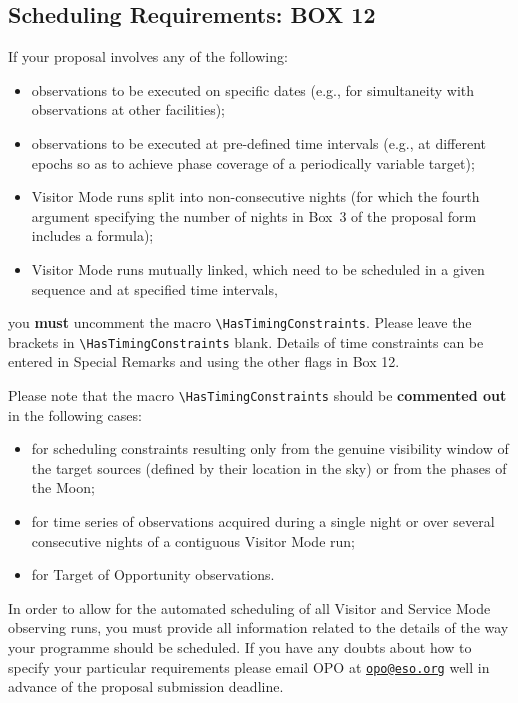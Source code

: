 \documentclass{article}
\begin{document}
\subsection{Scheduling Requirements: {\bf BOX 12}}
\label{sec:schedreq}
If your proposal involves any of the following:
\begin{itemize}
\item observations to be executed on specific dates (e.g., for
  simultaneity with observations at other facilities);
\item observations to be executed at pre-defined time intervals (e.g.,
  at different epochs so as to achieve phase coverage of a periodically
  variable target);
\item Visitor Mode runs split into non-consecutive nights (for which
  the fourth argument specifying the number of nights in Box~3 of the
  proposal form includes a formula);
\item Visitor Mode runs mutually linked, which need to be scheduled in
  a given sequence and at specified time intervals,
\end{itemize}
you {\bf must} uncomment the macro \verb|\HasTimingConstraints|.
Please leave the brackets in \verb|\HasTimingConstraints| blank.  Details of time
 constraints can be entered in Special Remarks and using the
 other flags in Box 12.

Please note that the macro \verb|\HasTimingConstraints| should 
be {\bf commented out} in the following cases:
\begin{itemize}
\item for scheduling constraints resulting only from the genuine
  visibility window of the target sources (defined by their location
  in the sky) or from the phases of the Moon; 
\item for time series of observations acquired during a single night
  or over several consecutive nights of a contiguous Visitor Mode run; 
\item for Target of Opportunity observations.
\end{itemize} 

In order to allow for the automated scheduling of all
Visitor and Service Mode observing runs, you must provide all
information related to the details of the way your programme should be
scheduled.  If you have any doubts about how to specify your particular
requirements please email OPO at \href{mailto:opo@eso.org}{\tt opo@eso.org}
well in advance of the proposal submission deadline.

\medskip
\end{document}
